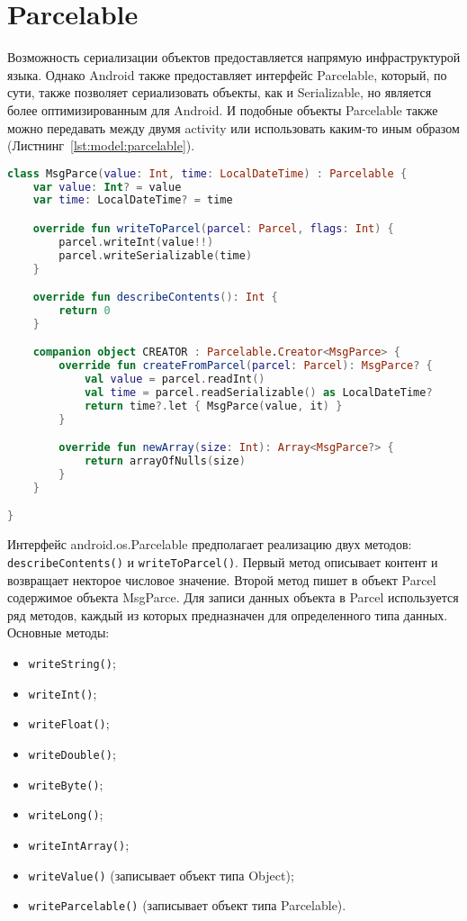 \section{Parcelable}
Возможность сериализации объектов предоставляется напрямую
инфраструктурой языка. Однако Android также предоставляет
интерфейс Parcelable, который, по сути, также позволяет сериализовать
объекты, как и Serializable, но является более оптимизированным для
Android. И подобные объекты Parcelable также можно передавать между
двумя activity или использовать каким-то иным образом
(Листнинг~\ref{lst:model:parcelable}).
\begin{lstlisting}[language=Kotlin, caption=\leftline{}, label=lst:model:parcelable]
	class MsgParce(value: Int, time: LocalDateTime) : Parcelable {
    var value: Int? = value
    var time: LocalDateTime? = time

    override fun writeToParcel(parcel: Parcel, flags: Int) {
        parcel.writeInt(value!!)
        parcel.writeSerializable(time)
    }

    override fun describeContents(): Int {
        return 0
    }

    companion object CREATOR : Parcelable.Creator<MsgParce> {
        override fun createFromParcel(parcel: Parcel): MsgParce? {
            val value = parcel.readInt()
            val time = parcel.readSerializable() as LocalDateTime?
            return time?.let { MsgParce(value, it) }
        }

        override fun newArray(size: Int): Array<MsgParce?> {
            return arrayOfNulls(size)
        }
    }

}
\end{lstlisting}


Интерфейс android.os.Parcelable предполагает реализацию двух методов:
\texttt{describeContents()} и \texttt{writeToParcel()}.
Первый метод описывает контент и возвращает некторое числовое значение.
Второй метод пишет в объект Parcel содержимое объекта MsgParce.
Для записи данных объекта в Parcel используется ряд методов, каждый из
которых предназначен для определенного типа данных. Основные методы:
\begin{itemize}
	\item \texttt{writeString()};
	\item \texttt{writeInt()};
	\item \texttt{writeFloat()};
	\item \texttt{writeDouble()};
	\item \texttt{writeByte()};
	\item \texttt{writeLong()};
	\item \texttt{writeIntArray()};
	\item \texttt{writeValue()} (записывает объект типа Object);
	\item \texttt{writeParcelable()} (записывает объект типа Parcelable).
\end{itemize}

